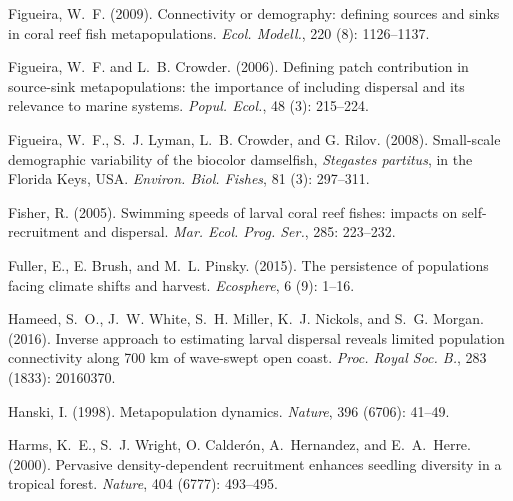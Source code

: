 \documentclass[12pt, oneside]{article}   	%
\begin{document}
\begin{thebibliography}{66}
Figueira, W.~F. (2009).
\newblock Connectivity or demography: defining sources and sinks in coral reef
  fish metapopulations.
\newblock \emph{Ecol. Modell.}, 220 (8): 1126--1137.

Figueira, W.~F. and L.~B. Crowder. (2006).
\newblock Defining patch contribution in source-sink metapopulations: the
  importance of including dispersal and its relevance to marine systems.
\newblock \emph{Popul. Ecol.}, 48 (3): 215--224.

Figueira, W.~F., S.~J. Lyman, L.~B. Crowder, and G. Rilov. (2008).
\newblock Small-scale demographic variability of the biocolor damselfish,
  \textit{Stegastes partitus}, in the Florida Keys, USA.
\newblock \emph{Environ. Biol. Fishes}, 81 (3):
  297--311.

Fisher, R. (2005).
\newblock Swimming speeds of larval coral reef fishes: impacts on
  self-recruitment and dispersal.
\newblock \emph{Mar. Ecol. Prog. Ser.}, 285: 223--232.

Fuller, E., E. Brush, and M.~L. Pinsky. (2015).
\newblock The persistence of populations facing climate shifts and harvest.
\newblock \emph{Ecosphere}, 6 (9): 1--16.

Hameed, S.~O., J.~W. White, S.~H. Miller, K.~J. Nickols, and S.~G.
  Morgan. (2016).
\newblock Inverse approach to estimating larval dispersal reveals limited
  population connectivity along 700 km of wave-swept open coast.
\newblock \emph{Proc. Royal Soc. B.},
  283 (1833): 20160370.

Hanski, I. (1998).
\newblock Metapopulation dynamics.
\newblock \emph{Nature}, 396 (6706): 41--49.

Harms, K.~E., S.~J. Wright, O. Calder{\'o}n, A.~Hernandez, and
  E.~A.~Herre. (2000).
\newblock Pervasive density-dependent recruitment enhances seedling diversity
  in a tropical forest.
\newblock \emph{Nature}, 404 (6777): 493--495.


\end{thebibliography}
\end{document}
